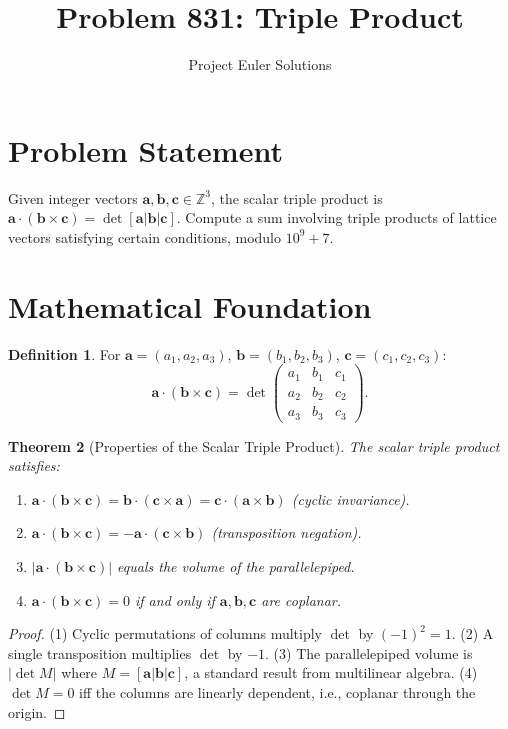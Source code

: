 \documentclass[11pt]{article}
\title{Problem 831: Triple Product}
\author{Project Euler Solutions}
\date{}
\newtheorem{theorem}{Theorem}
\theoremstyle{definition}
\newtheorem{definition}[theorem]{Definition}
\begin{document}
\maketitle

\section{Problem Statement}

Given integer vectors $\mathbf{a}, \mathbf{b}, \mathbf{c} \in \mathbb{Z}^3$, the scalar triple product is $\mathbf{a} \cdot (\mathbf{b} \times \mathbf{c}) = \det[\mathbf{a}|\mathbf{b}|\mathbf{c}]$. Compute a sum involving triple products of lattice vectors satisfying certain conditions, modulo $10^9+7$.

\section{Mathematical Foundation}

\begin{definition}
For $\mathbf{a} = (a_1,a_2,a_3)$, $\mathbf{b} = (b_1,b_2,b_3)$, $\mathbf{c} = (c_1,c_2,c_3)$:
\[
\mathbf{a}\cdot(\mathbf{b}\times\mathbf{c}) = \det\begin{pmatrix} a_1 & b_1 & c_1 \\ a_2 & b_2 & c_2 \\ a_3 & b_3 & c_3 \end{pmatrix}.
\]
\end{definition}

\begin{theorem}[Properties of the Scalar Triple Product]
The scalar triple product satisfies:
\begin{enumerate}
\item $\mathbf{a}\cdot(\mathbf{b}\times\mathbf{c}) = \mathbf{b}\cdot(\mathbf{c}\times\mathbf{a}) = \mathbf{c}\cdot(\mathbf{a}\times\mathbf{b})$ (cyclic invariance).
\item $\mathbf{a}\cdot(\mathbf{b}\times\mathbf{c}) = -\mathbf{a}\cdot(\mathbf{c}\times\mathbf{b})$ (transposition negation).
\item $|\mathbf{a}\cdot(\mathbf{b}\times\mathbf{c})|$ equals the volume of the parallelepiped.
\item $\mathbf{a}\cdot(\mathbf{b}\times\mathbf{c})=0$ if and only if $\mathbf{a},\mathbf{b},\mathbf{c}$ are coplanar.
\end{enumerate}
\end{theorem}

\begin{proof}
(1) Cyclic permutations of columns multiply $\det$ by $(-1)^2=1$.
(2) A single transposition multiplies $\det$ by $-1$.
(3) The parallelepiped volume is $|\det M|$ where $M=[\mathbf{a}|\mathbf{b}|\mathbf{c}]$, a standard result from multilinear algebra.
(4) $\det M = 0$ iff the columns are linearly dependent, i.e., coplanar through the origin.
\end{proof}
\end{document}
